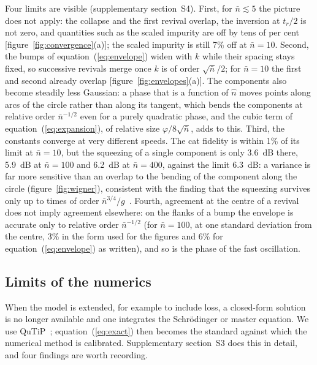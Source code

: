\documentclass{iopjournal}
\newcommand{\nbar}{\bar{n}}
\begin{document}
Four limits are visible (supplementary section~S4). First, for $\nbar\lesssim 5$ the picture does not apply: the collapse and the first revival overlap, the inversion at $t_r/2$ is not zero, and quantities such as the scaled impurity are off by tens of per cent [figure~\ref{fig:convergence}(a)]; the scaled impurity is still 7\% off at $\nbar = 10$. Second, the bumps of equation~(\ref{eq:envelope}) widen with $k$ while their spacing stays fixed, so successive revivals merge once $k$ is of order $\sqrt{\nbar}/2$; for $\nbar = 10$ the first and second already overlap [figure~\ref{fig:envelopes}(a)]. The components also become steadily less Gaussian: a phase that is a function of $\hat n$ moves points along arcs of the circle rather than along its tangent, which bends the components at relative order $\nbar^{-1/2}$ even for a purely quadratic phase, and the cubic term of equation~(\ref{eq:expansion}), of relative size $\varphi/8\sqrt{\nbar}$, adds to this. Third, the constants converge at very different speeds. The cat fidelity is within 1\% of its limit at $\nbar = 10$, but the squeezing of a single component is only 3.6~dB there, 5.9~dB at $\nbar = 100$ and 6.2~dB at $\nbar = 400$, against the limit 6.3~dB: a variance is far more sensitive than an overlap to the bending of the component along the circle (figure~\ref{fig:wigner}), consistent with the finding that the squeezing survives only up to times of order $\nbar^{3/4}/g$~\cite{woods1993}. Fourth, agreement at the centre of a revival does not imply agreement elsewhere: on the flanks of a bump the envelope is accurate only to relative order $\nbar^{-1/2}$ (for $\nbar = 100$, at one standard deviation from the centre, 3\% in the form used for the figures and 6\% for equation~(\ref{eq:envelope}) as written), and so is the phase of the fast oscillation.

\subsection{Limits of the numerics}

When the model is extended, for example to include loss, a closed-form solution is no longer available and one integrates the Schr\"{o}dinger or master equation. We use QuTiP~\cite{johansson2012, johansson2013, lambert2026}; equation~(\ref{eq:exact}) then becomes the standard against which the numerical method is calibrated. Supplementary section~S3 does this in detail, and four findings are worth recording.
\end{document}
